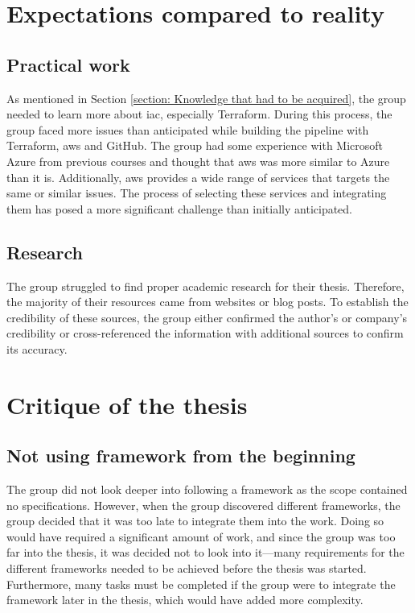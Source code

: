 \section{Expectations compared to reality}
\subsection{Practical work}
As mentioned in Section \ref{section: Knowledge that had to be acquired}, the group needed to learn more about \gls{iac}, especially Terraform. During this process, the group faced more issues than anticipated while building the \gls{pipeline} with Terraform, \acrshort{aws} and GitHub. The group had some experience with Microsoft Azure from previous courses and thought that \acrshort{aws} was more similar to Azure than it is. Additionally, \acrshort{aws} provides a wide range of services that targets the same or similar issues. The process of selecting these services and integrating them has posed a more significant challenge than initially anticipated. 

\subsection{Research}
The group struggled to find proper academic research for their thesis. Therefore, the majority of their resources came from websites or blog posts. To establish the credibility of these sources, the group either confirmed the author's or company's credibility or cross-referenced the information with additional sources to confirm its accuracy. 


\section{Critique of the thesis}

\subsection{Not using framework from the beginning}
The group did not look deeper into following a framework as the scope contained no specifications. However, when the group discovered different frameworks, the group decided that it was too late to integrate them into the work. Doing so would have required a significant amount of work, and since the group was too far into the thesis, it was decided not to look into it—many requirements for the different frameworks needed to be achieved before the thesis was started. Furthermore, many tasks must be completed if the group were to integrate the framework later in the thesis, which would have added more complexity. 

